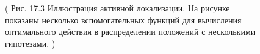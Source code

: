 \documentclass[10pt,a4paper]{article}
\begin{document}
\begin{figure}[H]
	\caption{ ( Рис. 17.3 Иллюстрация активной локализации. На рисунке показаны несколько вспомогательных функций для вычисления оптимального действия в распределении положений с несколькими гипотезами. ) }
	\label{fig:173orig}
\end{figure}
\end{document}
